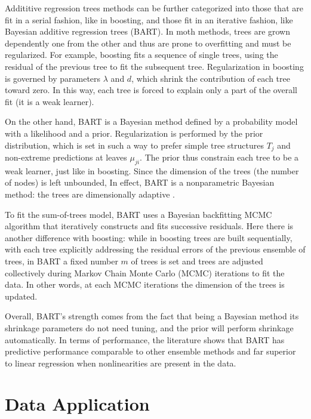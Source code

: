 \documentclass[a4paper,11pt]{article}
\begin{document}
Addititive regression trees methods can be further categorized into those that are fit in a serial fashion, like in boosting, and those fit in an iterative fashion, like
Bayesian additive regression trees (BART). In moth methods, trees are grown dependently one from the other and thus are prone to overfitting and must be regularized. For example, boosting fits a sequence of single trees, using the residual of the previous tree to fit the subsequent tree. Regularization in boosting is governed by parameters $\lambda$ and $d$, which shrink the contribution of each tree toward zero. In this way, each tree is forced to explain only a part of the overall fit (it is a weak learner). 

On the other hand, BART is a Bayesian method defined by a probability model with a likelihood and a prior. Regularization is performed by the prior distribution, which is set in such a way to prefer simple tree structures $T_j$ and non-extreme predictions at leaves $\mu_{ji}$. The prior thus constrain each tree to be a weak learner, just like in boosting. Since the dimension of the trees (the number of nodes) is left unbounded,  In effect, BART is a nonparametric Bayesian method: the trees are dimensionally adaptive \parencite{chipmanBARTBayesianAdditive2010}.

To fit the sum-of-trees model, BART uses a Bayesian backfitting MCMC algorithm that iteratively constructs and fits successive residuals. Here there is another difference with boosting: while in boosting trees are built sequentially, with each tree explicitly addressing the residual errors of the previous ensemble of trees, in BART a fixed number $m$ of trees is set and trees are adjusted collectively during Markov Chain Monte Carlo (MCMC) iterations to fit the data. In other words, at each MCMC iterations the dimension of the trees is updated.  

Overall, BART's strength comes from the fact that being a Bayesian method its shrinkage parameters do not need tuning, and the prior will perform shrinkage automatically. In terms of performance, the literature \cite{chipmanBARTBayesianAdditive2010} shows that BART has predictive performance comparable to other ensemble methods and far superior to linear regression when nonlinearities are present in the data. 

  
\section{Data Application}
\label{data_app}
\end{document}
